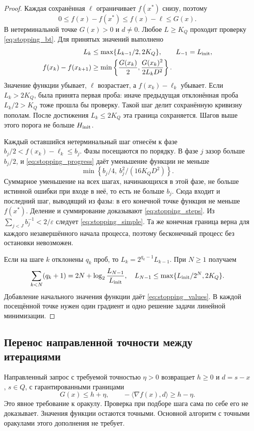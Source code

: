 \begin{proof}
Каждая сохранённая $\ell$ ограничивает $f(x^*)$ снизу, поэтому
\[
 0\le f(x)-f(x^*)\le f(x)-\ell\le G(x).
\]
В нетерминальной точке $G(x)>0$ и $d\ne0$.
Любое $L\ge K_Q$ проходит проверку \eqref{eq:stopping_bt}.
Для принятых значений выполнено
\begin{equation}\label{eq:stopping_progress}
 \begin{split}
 L_k&\le\max\{L_{k-1}/2,2K_Q\},\qquad L_{-1}=L_{\rm init},\\
 f(x_k)-f(x_{k+1})&\ge
 \min\left\{\frac{G(x_k)}2,\frac{G(x_k)^2}{2L_kD^2}\right\}.
 \end{split}
\end{equation}
Значение функции убывает, $\ell$ возрастает, а $f(x_k)-\ell_k$
убывает. Если $L_k>2K_Q$, была принята первая проба: иначе
предыдущая отклонённая проба $L_k/2>K_Q$ тоже прошла бы проверку.
Такой шаг делит сохранённую кривизну пополам. После достижения
$L_k\le2K_Q$ эта граница сохраняется. Шагов выше этого порога
не больше $H_{\rm init}$.

Каждый оставшийся нетерминальный шаг отнесём к фазе
$b_j/2<f(x_k)-\ell_k\le b_j$. Фазы посещаются по порядку.
В фазе $j$ зазор больше $b_j/2$, и \eqref{eq:stopping_progress}
даёт уменьшение функции не меньше
\[
 \min\left\{b_j/4,\ b_j^2/(16K_QD^2)\right\}.
\]
Суммарное уменьшение на всех шагах, начинающихся в этой фазе,
не больше истинной ошибки при входе в неё, то есть не больше $b_j$.
Сюда входит и последний шаг, выводящий из фазы: в его конечной
точке функция не меньше $f(x^*)$. Деление и суммирование доказывают
\eqref{eq:stopping_steps}. Из $\sum_{j<J}b_j^{-1}<2/\varepsilon$
следует \eqref{eq:stopping_simple}. Та же конечная граница верна
для каждого незавершённого начала процесса, поэтому бесконечный
процесс без остановки невозможен.

Если на шаге $k$ отклонены $q_k$ проб, то
$L_k=2^{q_k-1}L_{k-1}$. При $N\ge1$ получаем
\[
 \sum_{k<N}(q_k+1)=2N+\log_2\frac{L_{N-1}}{L_{\rm init}},
 \quad L_{N-1}\le\max\{L_{\rm init}/2^N,2K_Q\}.
\]
Добавление начального значения функции даёт
\eqref{eq:stopping_values}. В каждой посещённой точке нужен один
градиент и одно решение задачи линейной минимизации.
\end{proof}

\subsection{Перенос направленной точности между итерациями}
Направленный запрос с требуемой точностью $\eta>0$ возвращает
$h\ge0$ и $d=s-x$, $s\in Q$, с гарантированными границами
\begin{equation}\label{eq:directional_query}
 G(x)\le h+\eta,\qquad
 -\langle\nabla f(x),d\rangle\ge h-\eta.
\end{equation}
Это явное требование к оракулу. Проверка при подборе шага сама
по себе его не доказывает. Значения функции остаются точными.
Основной алгоритм с точными оракулами этого дополнения не требует.


